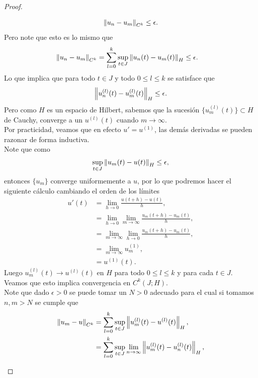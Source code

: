 \begin{proof}
\begin{enumerate}
      \begin{align*}
        \left\|u_{n}-u_{m}\right\|_{C^{k}}\leq \epsilon.
      \end{align*}
      Pero note que esto es lo mismo que
      \begin{align*}
        \left\|u_{n}-u_{m}\right\|_{C^{k}}=\sum_{l=0}^{k}\sup_{t\in J}\left\|u_{n}(t)-u_{m}(t)\right\|_{H}&\leq \epsilon.
      \end{align*}
      Lo que implica que para todo $t\in J$ y todo $0\leq l\leq k$ se satisface que
      \begin{align*}
        \left\|u_{n}^{(l)}(t)-u_{m}^{(l)}(t)\right\|_{H}\leq \epsilon.
      \end{align*}
      Pero como $H$ es un espacio de Hilbert, sabemos que la sucesión $\{u_{m}^{(l)}(t)\}\subset H$ de Cauchy, converge a un $u^{(l)}(t)$ cuando $m\to\infty$.\\
      Por practicidad, veamos que en efecto $u'=u^{(1)}$, las demás derivadas se pueden razonar de forma inductiva.\\
      Note que como
      \begin{align*}
        \sup_{t\in J}\left\|u_{m}(t)-u(t)\right\|_{H}\leq \epsilon,
      \end{align*}
      entonces $\{u_{m}\}$ converge uniformemente a $u$, por lo que podremos hacer el siguiente cálculo cambiando el orden de los límites 
      \begin{align*}
        u'(t)&=\lim_{h \to 0}\frac{u(t+h)-u(t)}{h},\\
        &=\lim_{h \to 0}\lim_{m \to \infty}\frac{u_{m}(t+h)-u_{m}(t)}{h},\\
        &=\lim_{m \to \infty}\lim_{h \to 0}\frac{u_{m}(t+h)-u_{m}(t)}{h},\\
        &=\lim_{m \to \infty}u_{m}^{(1)},\\
        &=u^{(1)}(t).
      \end{align*}
      Luego $u_{m}^{(l)}(t)\to u^{(l)}(t)$ en $H$ para todo $0\leq l\leq k$ y para cada $t\in J$.\\
      Veamos que esto implica convergencia en $C^k(J;H)$.\\
      Note que dado $\epsilon>0$ se puede tomar un $N>0$ adecuado para el cual si tomamos $n,m>N$ se cumple que 
      \begin{align*}
        \norm{u_{m}-u}_{C^{k}}&=\sum_{l=0}^{k}\sup_{t\in J}\norm{u_{m}^{(l)}(t)-u^{(l)}(t)}_{H},\\
        &=\sum_{l=0}^{k}\sup_{t\in J}\lim_{n \to \infty}\norm{u_{m}^{(l)}(t)-u_{n}^{(l)}(t)}_{H},\\

\end{align*}
\end{enumerate}
\end{proof}
